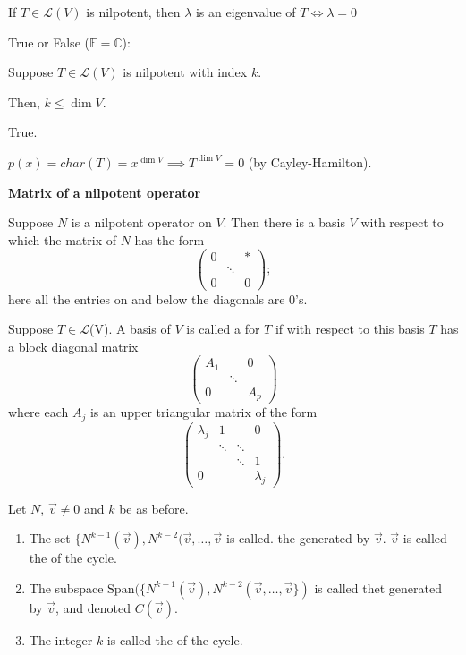 \documentclass[11pt,fleqn]{book} %
\begin{document}
 If $T \in \mathcal{L}(V)$ is nilpotent, then $\lambda$ is an eigenvalue of $T \iff \lambda = 0$

\begin{example}
    True or False ($\mathbb{F} = \mathbb{C}$):

    Suppose $T \in \mathcal{L}(V)$ is nilpotent with index $k$.

    Then, $k \le \dim V$.

    {\color{lightblue} True.

    $p(x) = char(T) = x^{\dim V} \implies T^{\dim V} = 0$ (by Cayley-Hamilton). }
\end{example}

\textbf{Matrix of a nilpotent operator}

Suppose $N$ is a nilpotent operator on $V$. Then there is a basis $V$ with respect to which the matrix of $N$ has the form $$\begin{pmatrix} 0 & &* \\ &\ddots \\0 & &0 \end{pmatrix};$$ here all the entries on and below the diagonals are $0$'s.

\begin{definition}
     Suppose $T \in \mathcal{L}$(V). A basis of $V$ is called a  for $T$ if with respect to this basis $T$ has a block diagonal matrix $$\begin{pmatrix} A_1 & &0 \\ &\ddots \\ 0 & &A_p \end{pmatrix}$$ where each $A_j$ is an upper triangular matrix of the form $$\begin{pmatrix} \lambda_j &1 & &0 \\ &\ddots &\ddots \\ & &\ddots &1 \\ 0 & & &\lambda_j \end{pmatrix}.$$
\end{definition}

\setcounter{chapter}{6}
\setcounter{section}{2}
\setcounter{definitionT}{0}
\begin{definition}[Cycle]
    Let $N$, $\vec{v} \neq 0$ and $k$ be as before.

    \begin{enumerate}[label=\alph*)]
        \item The set $\{ N^{k-1}(\vec{v}), N^{k-2}(\vec{v}, \dots, \vec{v}$ is called. the  generated by $\vec{v}$. $\vec{v}$ is called the  of the cycle.
        \item The subspace $\mathrm{Span}(\{ N^{k-1}(\vec{v}), N^{k-2}(\vec{v}, \dots, \vec{v} \})$ is called thet  generated by $\vec{v}$, and denoted $C(\vec{v})$.
        \item The integer $k$ is called the  of the cycle.
    \end{enumerate}
\end{definition}
\end{document}
